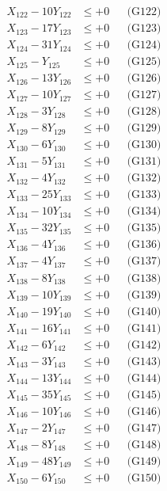 \documentclass[a4paper,10pt]{article}
\begin{document}
{\begin{align}
X_{122} - 10Y_{122} &\leq +0 && \text{(G122)} \\
X_{123} - 17Y_{123} &\leq +0 && \text{(G123)} \\
\allowbreak
X_{124} - 31Y_{124} &\leq +0 && \text{(G124)} \\
X_{125} - Y_{125} &\leq +0 && \text{(G125)} \\
X_{126} - 13Y_{126} &\leq +0 && \text{(G126)} \\
X_{127} - 10Y_{127} &\leq +0 && \text{(G127)} \\
X_{128} - 3Y_{128} &\leq +0 && \text{(G128)} \\
X_{129} - 8Y_{129} &\leq +0 && \text{(G129)} \\
X_{130} - 6Y_{130} &\leq +0 && \text{(G130)} \\
X_{131} - 5Y_{131} &\leq +0 && \text{(G131)} \\
X_{132} - 4Y_{132} &\leq +0 && \text{(G132)} \\
X_{133} - 25Y_{133} &\leq +0 && \text{(G133)} \\
\allowbreak
X_{134} - 10Y_{134} &\leq +0 && \text{(G134)} \\
X_{135} - 32Y_{135} &\leq +0 && \text{(G135)} \\
X_{136} - 4Y_{136} &\leq +0 && \text{(G136)} \\
X_{137} - 4Y_{137} &\leq +0 && \text{(G137)} \\
X_{138} - 8Y_{138} &\leq +0 && \text{(G138)} \\
X_{139} - 10Y_{139} &\leq +0 && \text{(G139)} \\
X_{140} - 19Y_{140} &\leq +0 && \text{(G140)} \\
X_{141} - 16Y_{141} &\leq +0 && \text{(G141)} \\
X_{142} - 6Y_{142} &\leq +0 && \text{(G142)} \\
X_{143} - 3Y_{143} &\leq +0 && \text{(G143)} \\
\allowbreak
X_{144} - 13Y_{144} &\leq +0 && \text{(G144)} \\
X_{145} - 35Y_{145} &\leq +0 && \text{(G145)} \\
X_{146} - 10Y_{146} &\leq +0 && \text{(G146)} \\
X_{147} - 2Y_{147} &\leq +0 && \text{(G147)} \\
X_{148} - 8Y_{148} &\leq +0 && \text{(G148)} \\
X_{149} - 48Y_{149} &\leq +0 && \text{(G149)} \\
X_{150} - 6Y_{150} &\leq +0 && \text{(G150)} \\

\end{align}}
\end{document}
